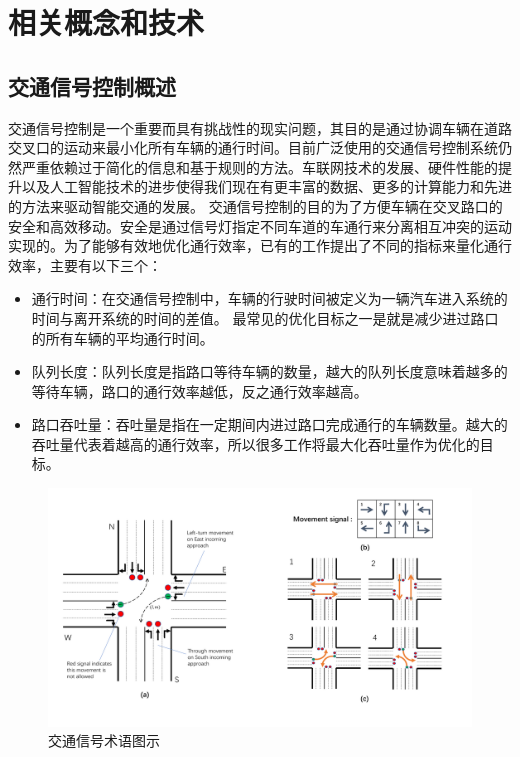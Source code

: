 
\chapter{相关概念和技术}
\section{交通信号控制概述}
交通信号控制是一个重要而具有挑战性的现实问题，其目的是通过协调车辆在道路交叉口的运动来最小化所有车辆的通行时间。目前广泛使用的交通信号控制系统仍然严重依赖过于简化的信息和基于规则的方法。车联网技术的发展、硬件性能的提升以及人工智能技术的进步使得我们现在有更丰富的数据、更多的计算能力和先进的方法来驱动智能交通的发展。 
交通信号控制的目的为了方便车辆在交叉路口的安全和高效移动。安全是通过信号灯指定不同车道的车通行来分离相互冲突的运动实现的。为了能够有效地优化通行效率，已有的工作提出了不同的指标来量化通行效率，主要有以下三个：
\begin{itemize}
    \item 通行时间：在交通信号控制中，车辆的行驶时间被定义为一辆汽车进入系统的时间与离开系统的时间的差值。 最常见的优化目标之一是就是减少进过路口的所有车辆的平均通行时间。
    \item 队列长度：队列长度是指路口等待车辆的数量，越大的队列长度意味着越多的等待车辆，路口的通行效率越低，反之通行效率越高。
    \item 路口吞吐量：吞吐量是指在一定期间内进过路口完成通行的车辆数量。越大的吞吐量代表着越高的通行效率，所以很多工作将最大化吞吐量作为优化的目标。
\end{itemize}

\begin{figure}[htb]
    \includegraphics[width=.9\textwidth]{fig/tsc.pdf}
    \caption{交通信号术语图示}
    \label{fig:tsc}
\end{figure}
